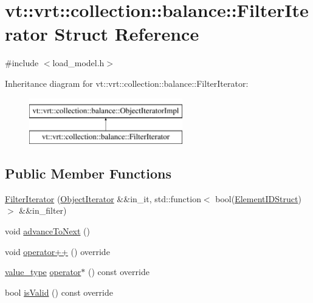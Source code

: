 \hypertarget{structvt_1_1vrt_1_1collection_1_1balance_1_1_filter_iterator}{}\section{vt\+:\+:vrt\+:\+:collection\+:\+:balance\+:\+:Filter\+Iterator Struct Reference}
\label{structvt_1_1vrt_1_1collection_1_1balance_1_1_filter_iterator}


{\ttfamily \#include $<$load\+\_\+model.\+h$>$}

Inheritance diagram for vt\+:\+:vrt\+:\+:collection\+:\+:balance\+:\+:Filter\+Iterator\+:\begin{figure}[H]
\begin{center}
\leavevmode
\includegraphics[height=2.000000cm]{structvt_1_1vrt_1_1collection_1_1balance_1_1_filter_iterator}
\end{center}
\end{figure}
\subsection*{Public Member Functions}
\begin{DoxyCompactItemize}
\item 
\hyperlink{structvt_1_1vrt_1_1collection_1_1balance_1_1_filter_iterator_a42adc2e7e360cfe536246aec10814296}{Filter\+Iterator} (\hyperlink{structvt_1_1vrt_1_1collection_1_1balance_1_1_object_iterator}{Object\+Iterator} \&\&in\+\_\+it, std\+::function$<$ bool(\hyperlink{structvt_1_1vrt_1_1collection_1_1balance_1_1_element_i_d_struct}{Element\+I\+D\+Struct})$>$ \&\&in\+\_\+filter)
\item 
void \hyperlink{structvt_1_1vrt_1_1collection_1_1balance_1_1_filter_iterator_a31bcf02ff4636713a425602de22b8f93}{advance\+To\+Next} ()
\item 
void \hyperlink{structvt_1_1vrt_1_1collection_1_1balance_1_1_filter_iterator_a354817d66e2736b1de818b4548419476}{operator++} () override
\item 
\hyperlink{structvt_1_1vrt_1_1collection_1_1balance_1_1_object_iterator_impl_a8a38ab2c722e341d729f61cb59112376}{value\+\_\+type} \hyperlink{structvt_1_1vrt_1_1collection_1_1balance_1_1_filter_iterator_a4812753d95ef26ea45dc053adc07cd3f}{operator$\ast$} () const override
\item 
bool \hyperlink{structvt_1_1vrt_1_1collection_1_1balance_1_1_filter_iterator_a3c92442ef2c78f8bd7bc2f03d06c11a1}{is\+Valid} () const override
\end{DoxyCompactItemize}
